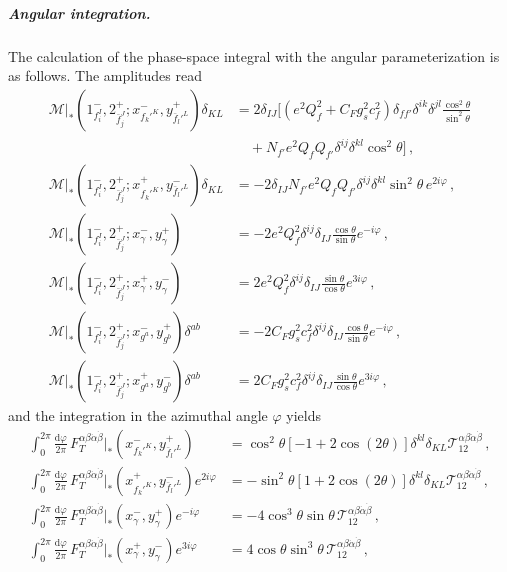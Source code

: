 \begin{subappendices}
\subparagraph{Angular integration.}
The calculation of the phase-space integral with the angular parameterization is as follows.
The amplitudes read
\begin{align}
    \mathcal M|_{*} (1_{f_i^I}^{-},2_{\bar f_j^J}^{+}; x_{f_k'^K}^{-},y_{\bar f_l'^L}^{+})\delta_{KL} &=
    2\delta_{IJ}\bigg[(e^2Q_f^2+C_Fg_s^2c_f^2)\delta_{ff'}\delta^{ik}\delta^{jl}\frac{\cos^2\theta}{\sin^2\theta}\nonumber\\ &\quad + N_{f'} e^2Q_f Q_{f'} \delta^{ij}\delta^{kl}\cos^2\theta \bigg]\,, \\
    \mathcal M|_{*} (1_{f_i^I}^{-},2_{\bar f_j^J}^{+}; x_{f_k'^K}^{+},y_{\bar f_l'^L}^{-})\delta_{KL} &= -2\delta_{IJ} N_{f'} e^2Q_f Q_{f'}\delta^{ij}\delta^{kl} \sin^2\theta\, e^{2i\varphi}\,, \\
    \mathcal M|_*(1^-_{f_i^I},2^+_{\bar f_j^J};x^-_\gamma,y^+_\gamma) &= -2e^2Q_f^2\delta^{ij}\delta_{IJ}\frac{\cos\theta}{\sin\theta}e^{-i\varphi}\,, \\
    \mathcal M|_*(1^-_{f_i^I},2^+_{\bar f_j^J};x^+_\gamma,y^-_\gamma) &= 2e^2Q_f^2\delta^{ij}\delta_{IJ}\frac{\sin\theta}{\cos\theta}e^{3i\varphi}\,, \\
    \mathcal M|_*(1^-_{f_i^I},2^+_{\bar f_j^J};x^-_{g^a},y^+_{g^b})\delta^{ab} &= -2C_Fg_s^2c_f^2\delta^{ij}\delta_{IJ}\frac{\cos\theta}{\sin\theta}e^{-i\varphi}\,, \\
    \mathcal M|_*(1^-_{f_i^I},2^+_{\bar f_j^J};x^+_{g^a},y^-_{g^b})\delta^{ab} &= 2C_Fg_s^2c_f^2\delta^{ij}\delta_{IJ}\frac{\sin\theta}{\cos\theta}e^{3i\varphi}\,,
\end{align}
and the integration in the azimuthal angle $\varphi$ yields
\begin{align}
    \int_0^{2\pi}\frac{\text{d}\varphi}{2\pi}\,F_T^{\alpha\beta\dot\alpha\dot\beta}|_{*}(x_{f_k'^K}^{-},y_{\bar f_l'^L}^{+}) &= \cos^2\theta[-1+2\cos(2\theta)]\delta^{kl}\delta_{KL}\mathcal T^{\alpha\beta\dot\alpha\dot\beta}_{12}\,,\\
    \int_0^{2\pi}\frac{\text{d}\varphi}{2\pi}\,F_T^{\alpha\beta\dot\alpha\dot\beta}|_{*}(x_{f_k'^K}^{+},y_{\bar f_l'^L}^{-})e^{2i\varphi} &= -\sin^2\theta [1+2\cos(2\theta)]\delta^{kl}\delta_{KL}\mathcal T^{\alpha\beta\dot\alpha\dot\beta}_{12}\,, \\
    \int_0^{2\pi}\frac{\text{d}\varphi}{2\pi}\,F_T^{\alpha\beta\dot\alpha\dot\beta}|_{*}(x_{\gamma}^{-},y_{\gamma}^{+})e^{-i\varphi} &= -4\cos^3\theta\sin\theta\, \mathcal T^{\alpha\beta\dot\alpha\dot\beta}_{12}\,, \\
    \int_0^{2\pi}\frac{\text{d}\varphi}{2\pi}\,F_T^{\alpha\beta\dot\alpha\dot\beta}|_{*}(x_{\gamma}^{+},y_{\gamma}^{-})e^{3i\varphi} &= 4\cos\theta\sin^3\theta\, \mathcal T^{\alpha\beta\dot\alpha\dot\beta}_{12}\,,\\

\end{align}
\end{subappendices}
